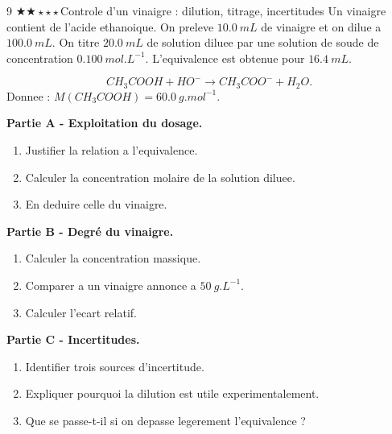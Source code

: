 \documentclass[11pt,a4paper]{article}
\newcommand{\difftwo}{\(\bigstar\bigstar\star\star\star\)}
\begin{document}
\begin{probleme}{9 \difftwo}{Controle d'un vinaigre : dilution, titrage, incertitudes}
Un vinaigre contient de l'acide ethanoique. On preleve \(\SI{10.0}{mL}\) de vinaigre et on dilue a \(\SI{100.0}{mL}\). On titre \(\SI{20.0}{mL}\) de solution diluee par une solution de soude de concentration \(\SI{0.100}{mol.L^{-1}}\). L'equivalence est obtenue pour \(\SI{16.4}{mL}\).

\[
CH_3COOH+HO^-\rightarrow CH_3COO^-+H_2O.
\]
Donnee : \(M(CH_3COOH)=\SI{60.0}{g.mol^{-1}}\).

\textbf{Partie A - Exploitation du dosage.}
\begin{enumerate}
\item Justifier la relation a l'equivalence.
\item Calculer la concentration molaire de la solution diluee.
\item En deduire celle du vinaigre.
\end{enumerate}

\textbf{Partie B - Degré du vinaigre.}
\begin{enumerate}[resume]
\item Calculer la concentration massique.
\item Comparer a un vinaigre annonce a \(\SI{50}{g.L^{-1}}\).
\item Calculer l'ecart relatif.
\end{enumerate}

\textbf{Partie C - Incertitudes.}
\begin{enumerate}[resume]
\item Identifier trois sources d'incertitude.
\item Expliquer pourquoi la dilution est utile experimentalement.
\item Que se passe-t-il si on depasse legerement l'equivalence ?
\end{enumerate}
\end{probleme}
\end{document}
